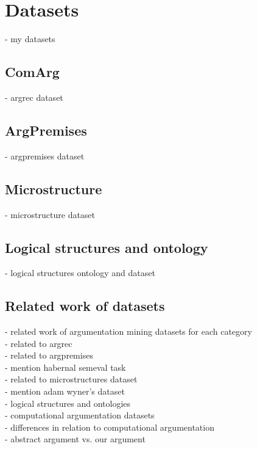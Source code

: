 \chapter{Datasets}

- my datasets \\

\section{ComArg}
- argrec dataset \\

\section{ArgPremises}
- argpremises dataset \\

\section{Microstructure}
- microstructure dataset \\

\section{Logical structures and ontology}
- logical structures ontology and dataset \\

\section{Related work of datasets}
\noindent - related work of argumentation mining datasets for each category \\
- related to argrec \\

\noindent - related to argpremises \\
- mention habernal semeval task \\

\noindent - related to microstructures dataset \\
- mention adam wyner's dataset \\

\noindent - logical structures and ontologies  \\
- computational argumentation datasets \\
- differences in relation to computational argumentation \\
- abstract argument vs. our argument \\
